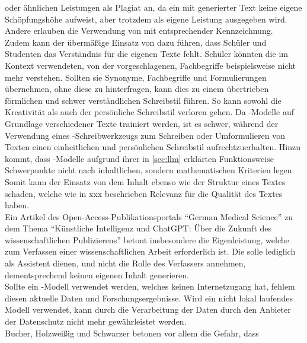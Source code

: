 \documentclass[../main.tex]{subfiles}
\begin{document}
oder ähnlichen Leistungen als Plagiat an, da ein mit  generierter Text keine eigene Schöpfungshöhe aufweist, aber trotzdem als eigene Leistung ausgegeben wird. Andere erlauben die Verwendung von 
 mit entsprechender Kennzeichnung.\cite{Plagiate}\\
Zudem kann der übermäßige Einsatz von  dazu führen, dass Schüler und Studenten das Verständnis für die eigenen Texte fehlt. Schüler könnten die im 
Kontext verwendeten, von der  vorgeschlagenen, Fachbegriffe beispielsweise nicht mehr verstehen. Sollten sie Synonyme, Fachbegriffe und Formulierungen 
übernehmen, ohne diese zu hinterfragen, kann dies zu einem übertrieben förmlichen und schwer verständlichen Schreibstil führen\cite{teachers}. 
So kann sowohl die Kreativität als auch der persönliche Schreibstil verloren gehen. Da -Modelle auf Grundlage verschiedener Texte trainiert werden, ist es
schwer, während der Verwendung eines -Schreibwerkzeugs zum Schreiben oder Umformulieren von Texten einen einheitlichen und persönlichen Schreibstil aufrechtzuerhalten\cite{creativeWriting}. Hinzu kommt,
dass -Modelle aufgrund ihrer in \autoref{sec:llm} erklärten Funktionsweise Schwerpunkte nicht nach inhaltlichen, sondern mathematischen Kriterien legen\cite{berensBolk}. Somit kann der 
Einsatz von  dem Inhalt ebenso wie der Struktur eines Textes schaden, welche wie in xxx beschrieben Relevanz für die Qualität des Textes haben.\\
Ein Artikel des Open-Access-Publikationsportals "`German Medical Science"' zu dem Thema "`Künstliche Intelligenz und ChatGPT: Über die Zukunft des wissenschaftlichen Publizierens"'
betont insbesondere die Eigenleistung, welche zum Verfassen einer wissenschaftlichen Arbeit erforderlich ist. Die  solle lediglich als Assistent dienen, und
nicht die Rolle des Verfassers annehmen, dementsprechend keinen eigenen Inhalt generieren.\cite{ZukunftWissenschaftlichesPublizieren} \\ Sollte ein -Modell verwendet werden, welches keinen Internetzugang hat,
fehlem diesen aktuelle Daten und Forschungsergebnisse. Wird ein nicht lokal laufendes Modell verwendet, kann durch die Verarbeitung der Daten durch den  Anbieter
der Datenschutz nicht mehr gewährleistet werden.\cite{ZukunftWissenschaftlichesPublizieren} \\ Bucher, Holzweißig und Schwarzer betonen vor allem die Gefahr, dass 
\end{document}
